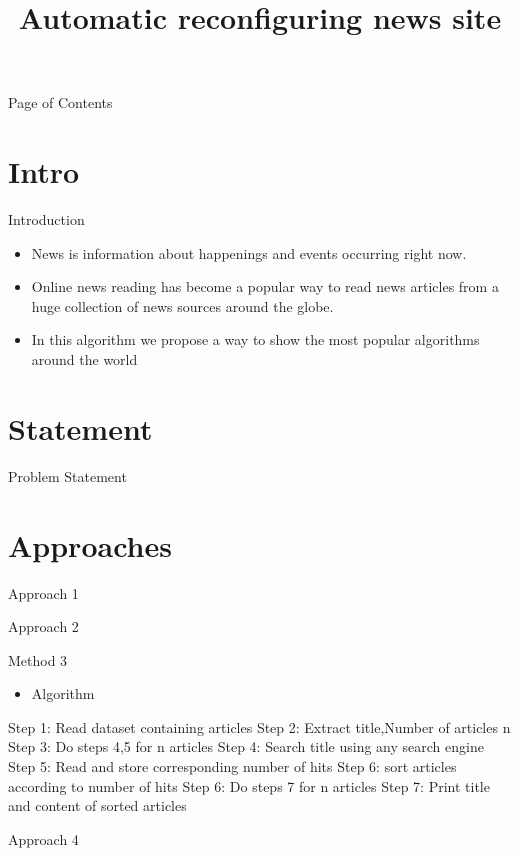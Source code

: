 \documentclass{beamer}
\title{Automatic reconfiguring news site}
\begin{document}
	\begin{frame}{Page of Contents}
		\tableofcontents
	\end{frame}
	\section{Intro}
	\begin{frame}{Introduction}
		\begin{itemize}
			\item  News is information about happenings and events occurring right now.
			\item Online news reading has become a popular way to read news articles from a huge collection of news sources around the globe.
			\item In this algorithm we propose a way to show the most popular algorithms around the world
		\end{itemize}
	\end{frame}
	\section{Statement}
	\begin{frame}{Problem Statement}
		
	\end{frame}
	\section{Approaches}
	\begin{frame}{Approach 1}
		
	\end{frame}
	\begin{frame}{Approach 2}
		
	\end{frame}
	\begin{frame}{Method 3}
		\begin{itemize}
			\item Algorithm
		\end{itemize}
		Step 1: Read dataset containing articles \newline
		Step 2: Extract title,Number of articles n \newline
		Step 3: Do steps 4,5 for n articles \newline
		Step 4: Search title using any search engine \newline
		Step 5: Read and store corresponding number of hits \newline
		Step 6: sort articles according to number of hits \newline
		Step 6: Do steps 7 for n articles \newline
		Step 7: Print title and content of sorted articles
		
	\end{frame}
	\begin{frame}{Approach 4}
		
	\end{frame}
\end{document}
